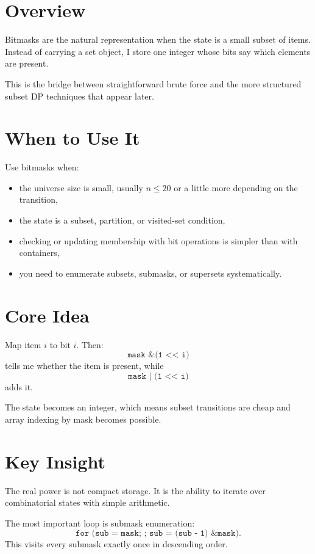 \section*{Overview}

Bitmasks are the natural representation when the state is a small subset of items. Instead of carrying a set object, I
store one integer whose bits say which elements are present.

This is the bridge between straightforward brute force and the more structured subset DP techniques that appear later.

\section*{When to Use It}

Use bitmasks when:

\begin{itemize}
  \item the universe size is small, usually \(n \le 20\) or a little more depending on the transition,
  \item the state is a subset, partition, or visited-set condition,
  \item checking or updating membership with bit operations is simpler than with containers,
  \item you need to enumerate subsets, submasks, or supersets systematically.
\end{itemize}

\section*{Core Idea}

Map item \(i\) to bit \(i\). Then:
\[
\texttt{mask \& (1 << i)}
\]
tells me whether the item is present, while
\[
\texttt{mask | (1 << i)}
\]
adds it.

The state becomes an integer, which means subset transitions are cheap and array indexing by mask becomes possible.

\section*{Key Insight}

The real power is not compact storage. It is the ability to iterate over combinatorial states with simple arithmetic.

The most important loop is submask enumeration:
\[
\texttt{for (sub = mask; ; sub = (sub - 1) \& mask)}.
\]
This visits every submask exactly once in descending order.

